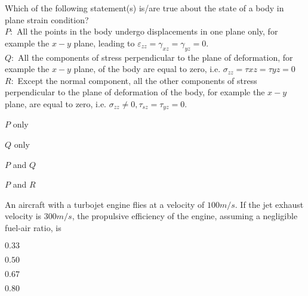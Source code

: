         \item Which of the following statement(s) is/are true about the state of a body in plane strain condition?\\
            $P:$ All the points in the body undergo displacements in one plane only, for example the $x-y$ plane, leading to $\varepsilon_{zz} = \gamma_{xz}=\gamma_{yz}=0$.\\
            $Q:$ All the components of stress perpendicular to the plane of deformation, for example the $x-y$ plane, of the body are equal to zero, i.e. $\sigma_{zz}= \tau{xz}=\tau{yz}=0$\\ 
            $R:$ Except the normal component, all the other components of stress perpendicular to the plane of deformation of the body, for example the $x-y$ plane, are equal to zero, i.e. $\sigma_{zz} \ne 0, \tau_{sz}=\tau_{yz}=0$. 
            \begin{enumerate}
                    \begin{multicols}{2}
                    \item $P$ only
                        \columnbreak
                    \item $Q$ only
                    \end{multicols}
                    \begin{multicols}{2}
                    \item $P$ and $Q$
                        \columnbreak
                    \item $P$ and $R$ 
                    \end{multicols}
            \end{enumerate}
        \item An aircraft with a turbojet engine flies at a velocity of $100 m/s$. If the jet exhaust velocity is $300 m/s$, the propulsive efficiency of the engine, assuming a negligible fuel-air ratio, is
            \begin{enumerate}
                    \begin{multicols}{2}
                    \item  $0.33$
                        \columnbreak
                    \item  $0.50$
                    \end{multicols}
                    \begin{multicols}{2}
                    \item $0.67$ 
                        \columnbreak
                    \item $0.80$
                    \end{multicols}
            \end{enumerate}
